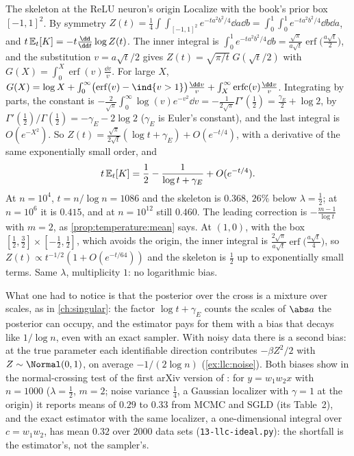 \begin{refsection}
\begin{computation}{The skeleton at the ReLU neuron's origin}\label{comp:llc:ideal}
\step Localize with the book's prior box $[-1,1]^2$. By symmetry $Z(t)=\tfrac14\int\!\!\int_{[-1,1]^2}e^{-ta^2b^2/4}\dd a\dd b=\int_0^1\!\!\int_0^1e^{-ta^2b^2/4}\dd b\dd a$, and $t\,\llcpop{K}=-t\frac{\dd}{\dd t}\log Z(t)$.
\step The inner integral is $\int_0^1e^{-ta^2b^2/4}\dd b=\frac{\sqrt\pi}{a\sqrt t}\operatorname{erf}\bigl(\frac{a\sqrt t}2\bigr)$, and the substitution $v=a\sqrt t/2$ gives $Z(t)=\sqrt{\pi/t}\;G(\sqrt t/2)$ with $G(X)=\int_0^X\operatorname{erf}(v)\frac{\dd v}v$.
\step For large $X$, $G(X)=\log X+\int_0^\infty\bigl(\operatorname{erf}(v)-\ind\{v>1\}\bigr)\frac{\dd v}v+\int_X^\infty\operatorname{erfc}(v)\frac{\dd v}v$. Integrating by parts, the constant is $-\frac2{\sqrt\pi}\int_0^\infty\log(v)e^{-v^2}\dd v=-\frac1{2\sqrt\pi}\Gamma'(\tfrac12)=\frac{\gamma_E}2+\log2$, by $\Gamma'(\tfrac12)/\Gamma(\tfrac12)=-\gamma_E-2\log2$ ($\gamma_E$ is Euler's constant), and the last integral is $O(e^{-X^2})$.
\step So $Z(t)=\frac{\sqrt\pi}{2\sqrt t}(\log t+\gamma_E)+O(e^{-t/4})$, with a derivative of the same exponentially small order, and
\[
t\,\mathbb{E}_{t}\!\left[K\right]=\frac12-\frac1{\log t+\gamma_E}+O(e^{-t/4}).
\]
\step At $n=10^4$, $t=n/\log n=1086$ and the skeleton is $0.368$, $26\%$ below $\lambda=\tfrac12$; at $n=10^6$ it is $0.415$, and at $n=10^{12}$ still $0.460$. The leading correction is $-\frac{m-1}{\log t}$ with $m=2$, as \cref{prop:temperature:mean} says.
\step At $(1,0)$, with the box $[\tfrac12,\tfrac32]\times[-\tfrac12,\tfrac12]$, which avoids the origin, the inner integral is $\frac{2\sqrt\pi}{a\sqrt t}\operatorname{erf}\bigl(\frac{a\sqrt t}4\bigr)$, so $Z(t)\propto t^{-1/2}(1+O(e^{-t/64}))$ and the skeleton is $\tfrac12$ up to exponentially small terms. Same $\lambda$, multiplicity $1$: no logarithmic bias.
\end{computation}

What one had to notice is that the posterior over the cross is a mixture over scales, as in \cref{ch:singular}: the factor $\log t+\gamma_E$ counts the scales of $\abs a$ the posterior can occupy, and the estimator pays for them with a bias that decays like $1/\log n$, even with an exact sampler. With noisy data there is a second bias: at the true parameter each identifiable direction contributes $-\beta Z^2/2$ with $Z\sim\Normal(0,1)$, on average $-1/(2\log n)$ (\cref{ex:llc:noise}). Both biases show in the normal-crossing test of the first arXiv version of \textcite{LauEtAl2025}: for $y=w_1w_2x$ with $n=1000$ ($\lambda=\tfrac12$, $m=2$; noise variance $\tfrac14$, a Gaussian localizer with $\gamma=1$ at the origin) it reports means of $0.29$ to $0.33$ from MCMC and SGLD (its Table~2), and the exact estimator with the same localizer, a one-dimensional integral over $c=w_1w_2$, has mean $0.32$ over $2000$ data sets (\texttt{13-llc-ideal.py}): the shortfall is the estimator's, not the sampler's.


\end{refsection}
